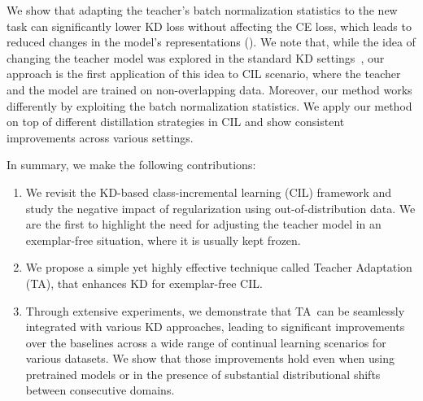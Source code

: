 \documentclass[10pt,twocolumn,letterpaper]{article}
\newcommand\rev[1]{{#1}}
\newcommand\ta{TA}
\begin{document}
\rev{We show that adapting the teacher's batch normalization statistics to the new task can significantly lower KD loss without affecting the CE loss, which leads to reduced changes in the model's representations (\Cref{fig:teaser}). 
We note that, while the idea of changing the teacher model was explored in the standard KD settings~\cite{zhou2022BERTteach,ma2022knowledge}, our approach is the first application of this idea to CIL scenario, where the teacher and the model are trained on non-overlapping data. Moreover, our method works differently by exploiting the batch normalization statistics.}
We apply our method on top of different distillation strategies in CIL and show consistent improvements across various settings.

In summary, we make the following contributions: 
\begin{enumerate}
    \item We revisit the KD-based class-incremental learning (CIL) framework and study the negative impact of regularization using out-of-distribution data. We are the first to highlight the need for adjusting the teacher model in an exemplar-free situation, where it is usually kept frozen.
    \item We propose a simple yet highly effective technique called Teacher Adaptation (TA), that enhances KD for exemplar-free CIL.
    \item Through extensive experiments, we demonstrate that \ta\ can be seamlessly integrated with various KD approaches, leading to significant improvements over the baselines across a wide range of continual learning scenarios for various datasets. We show that those improvements hold even when using pretrained models or in the presence of substantial distributional shifts between consecutive domains.
\end{enumerate}
\end{document}
